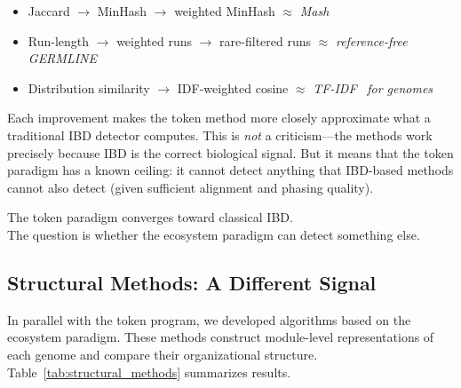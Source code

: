 \documentclass{../yalumba}
\begin{document}
\begin{itemize}
  \item Jaccard $\to$ MinHash $\to$ weighted MinHash $\approx$
    \emph{Mash}~\cite{ondov2016mash}
  \item Run-length $\to$ weighted runs $\to$ rare-filtered runs $\approx$
    \emph{reference-free GERMLINE}
  \item Distribution similarity $\to$ IDF-weighted cosine $\approx$
    \emph{TF-IDF}~\cite{salton1988tfidf} \emph{for genomes}
\end{itemize}

Each improvement makes the token method more closely approximate what a
traditional IBD detector computes.  This is \emph{not} a criticism---the
methods work precisely because IBD is the correct biological signal.
But it means that the token paradigm has a known ceiling: it cannot
detect anything that IBD-based methods cannot also detect (given
sufficient alignment and phasing quality).

\begin{pullquote}
The token paradigm converges toward classical IBD.\\
The question is whether the ecosystem paradigm can detect something else.
\end{pullquote}

\subsection{Structural Methods: A Different Signal}
\label{sec:trajectory:structural}

In parallel with the token program, we developed algorithms based on
the ecosystem paradigm.  These methods construct module-level
representations of each genome and compare their organizational
structure.  Table~\ref{tab:structural_methods} summarizes results.
\end{document}
